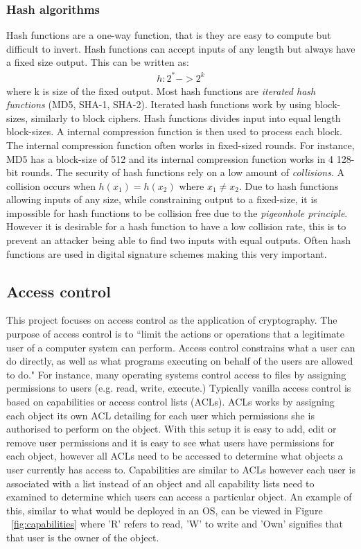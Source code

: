 \documentclass[12pt, titlepage]{article}
\begin{document}
\subsubsection*{Hash algorithms}
Hash functions are a one-way function, that is they are easy to compute but difficult to invert. Hash functions can accept inputs of any length but always have a fixed size output. This can be written as:
\begin{align*}
h: 2^* -> 2^k
\end{align*}
where k is size of the fixed output.
\newline \indent Most hash functions are \textit{iterated hash functions} (MD5, SHA-1, SHA-2). Iterated hash functions work by using block-sizes, similarly to block ciphers. Hash functions divides input into equal length block-sizes. A internal compression function is then used to process each block. The internal compression function often works in fixed-sized rounds. For instance, MD5 has a block-size of 512 and its internal compression function works in 4 128-bit rounds.
\newline \indent The security of hash functions rely on a low amount of \textit{collisions}. A collision occurs when $h(x_1) = h(x_2)$ where $x_1 \neq x_2$. Due to hash functions allowing inputs of any size, while constraining output to a fixed-size, it is impossible for hash functions to be collision free due to the \textit{pigeonhole principle}. However it is desirable for a hash function to have a low collision rate, this is to prevent an attacker being able to find two inputs with equal outputs. Often hash functions are used in digital signature schemes making this very important.

\subsection{Access control}
This project focuses on access control as the application of cryptography. The purpose of access control is to ``limit the actions or operations that a legitimate user of a computer system can perform. Access control constrains what a user can do directly, as well as what programs executing on behalf of the users are allowed to do."\cite{accessControlPrinciples} For instance, many operating systems control access to files by assigning permissions to users (e.g. read, write, execute.) Typically vanilla access control is based on capabilities or access control lists (ACLs). ACLs works by assigning each object its own ACL detailing for each user which permissions she is authorised to perform on the object. With this setup it is easy to add, edit or remove user permissions and it is easy to see what users have permissions for each object, however all ACLs need to be accessed to determine what objects a user currently has access to. Capabilities are similar to ACLs however each user is associated with a list instead of an object and all capability lists need to examined to determine which users can access a particular object. An example of this, similar to what would be deployed in an OS, can be viewed in Figure ~\ref{fig:capabilities} where 'R' refers to read, 'W' to write and 'Own' signifies that that user is the owner of the object.
\end{document}

